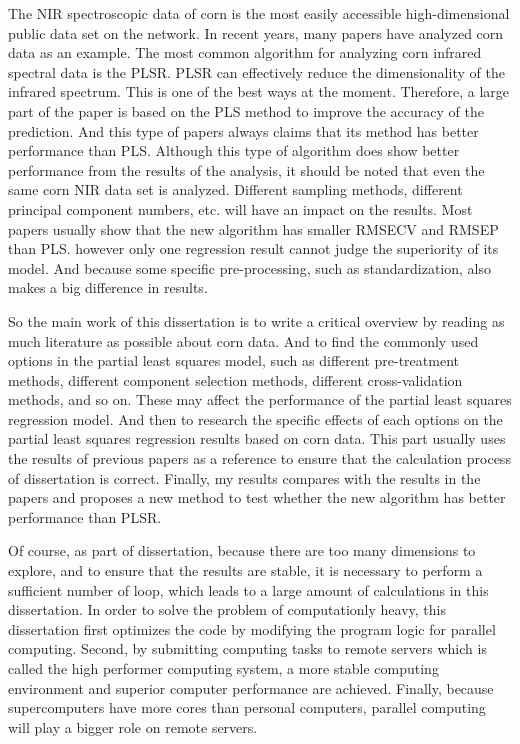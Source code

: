 \documentclass[a4paper,12pt,titlepage]{article} %
\numberwithin{equation}{section}  %
\begin{document}
	The NIR spectroscopic data of corn is the most easily accessible high-dimensional public data set on the network. In recent years, many papers have analyzed corn data as an example. The most common algorithm for analyzing corn infrared spectral data is the PLSR. PLSR can effectively reduce the dimensionality of the infrared spectrum. This is one of the best ways at the moment. Therefore, a large part of the paper is based on the PLS method to improve the accuracy of the prediction. And this type of papers always claims that its method has better performance than PLS. Although this type of algorithm does show better performance from the results of the analysis, it should be noted that even the same corn NIR data set is analyzed. Different sampling methods, different principal component numbers, etc. will have an impact on the results. Most papers usually show that the new algorithm has smaller RMSECV and RMSEP than PLS. however only one regression result cannot judge the superiority of its model. And because some specific pre-processing, such as standardization, also makes a big difference in results.
	
	So the main work of this dissertation is to write a critical overview by reading as much literature as possible about corn data. And to find the commonly used options in the partial least squares model, such as different pre-treatment methods, different component selection methods, different cross-validation methods, and so on. These may affect the performance of the partial least squares regression model.
	And then to research the specific effects of each options on the partial least squares regression results based on corn data. This part usually uses the results of previous papers as a reference to ensure that the calculation process of dissertation is correct. 
	Finally, my results compares with the results in the papers and proposes a new method to test whether the new algorithm has better performance than PLSR. 
	
	Of course, as part of dissertation, because there are too many dimensions to explore, and to ensure that the results are stable, it is necessary to perform a sufficient number of loop, which leads to a large amount of calculations in this dissertation. In order to solve the problem of computationly heavy, this dissertation first optimizes the code by modifying the program logic for parallel computing. Second, by submitting computing tasks to remote servers which is called the high performer computing system, a more stable computing environment and superior computer performance are achieved. Finally, because supercomputers have more cores than personal computers, parallel computing will play a bigger role on remote servers.
	
\end{document}
